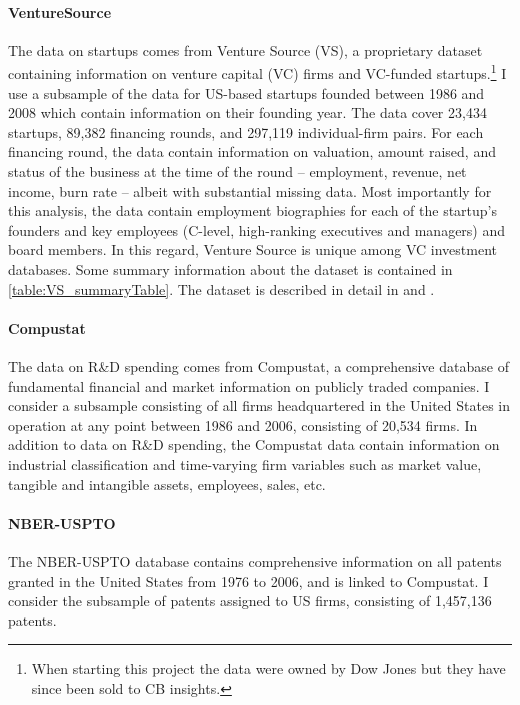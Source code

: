 \documentclass[11pt,english]{article}
\begin{document}
\paragraph{VentureSource}

The data on startups comes from Venture Source (VS), a proprietary dataset containing information on venture capital (VC) firms and VC-funded startups.\footnote{When starting this project the data were owned by Dow Jones but they have since been sold to CB insights.} I use a subsample of the data for US-based startups founded between 1986 and 2008 which contain information on their founding year. The data cover 23,434 startups, 89,382 financing rounds, and 297,119 individual-firm pairs. For each financing round, the data contain information on valuation, amount raised, and status of the business at the time of the round -- employment, revenue, net income, burn rate -- albeit with substantial missing data. Most importantly for this analysis, the data contain employment biographies for each of the startup's founders and key employees (C-level, high-ranking executives and managers) and board members. In this regard, Venture Source is unique among VC investment databases. Some summary information about the dataset is contained in \autoref{table:VS_summaryTable}. The dataset is described in detail in \cite{kaplan_how_2002} and \cite{kaplan_venture_2016}. 

\paragraph{Compustat}

The data on R\&D spending comes from Compustat, a comprehensive database of fundamental financial and market information on publicly traded companies. I consider a subsample consisting of all firms headquartered in the United States in operation at any point between 1986 and 2006, consisting of 20,534 firms. In addition to data on R\&D spending, the Compustat data contain information on industrial classification and time-varying firm variables such as market value, tangible and intangible assets, employees, sales, etc.

\paragraph{NBER-USPTO}

The NBER-USPTO database contains comprehensive information on all patents granted in the United States from 1976 to 2006, and is linked to Compustat. I consider the subsample of patents assigned to US firms, consisting of 1,457,136 patents. 
\end{document}
